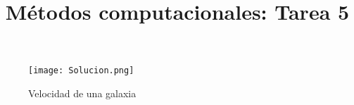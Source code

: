 \documentclass{article}
\title{\vspace{-15mm}\fontsize{24pt}{10pt}\selectfont\textbf{Métodos computacionales: Tarea 5}}
\begin{document}
\maketitle
\begin{figure}[ht!]
	\centering
		\texttt{[image: Solucion.png]}
	\caption{Velocidad de una galaxia}
\end{figure}
\end{document}
